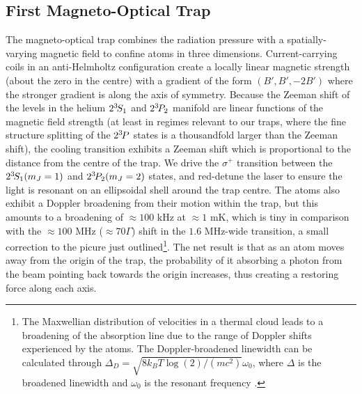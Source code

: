 
\subsection*{First Magneto-Optical Trap}
	The magneto-optical trap combines the radiation pressure with a spatially-varying magnetic field to confine atoms in three dimensions.
	Current-carrying coils in an anti-Helmholtz configuration create a locally linear magnetic strength (about the zero in the centre) with a gradient of the form $(B',B',-2B')$ where the stronger gradient is along the axis of symmetry. 
	Because the Zeeman shift of the levels in the helium $2^{3\!} S_1$ and $2^{3\!} P_2$ manifold are linear functions of the magnetic field strength (at least in regimes relevant to our traps, where the fine structure splitting of the $2^{3\!} P$ states is a thousandfold larger than the Zeeman shift), the cooling transition exhibits a Zeeman shift which is proportional to the distance from the centre of the trap.
	We drive the $\sigma^+$ transition between the $2^{3\!} S_1(m_J=1)$ and $2^{3\!} P_2(m_J=2)$ states, and red-detune the laser to ensure the light is resonant on an ellipsoidal shell around the trap centre.
	The atoms also exhibit a Doppler broadening from their motion within the trap, but this amounts to a broadening of $\approx100$ kHz at $\approx1$ mK, which is tiny in comparison with the $\approx 100$ MHz ($\approx 70\Gamma$) shift in the $1.6$ MHz-wide transition, a small correction to the picure just outlined\footnote{The Maxwellian distribution of velocities in a thermal cloud leads to a broadening of the absorption line due to the range of Doppler shifts experienced by the atoms. The Doppler-broadened linewidth can be calculated through $\Delta_{D} = \sqrt{8 k_B T\log(2)/(mc^2)}\omega_0$, where $\Delta$ is the broadened linewidth and $\omega_0$ is the resonant frequency \cite{FootAtomic}.}.
	The net result is that as an atom moves away from the origin of the trap, the probability of it absorbing a photon from the beam pointing back towards the origin increases, thus creating a restoring force along each axis.

